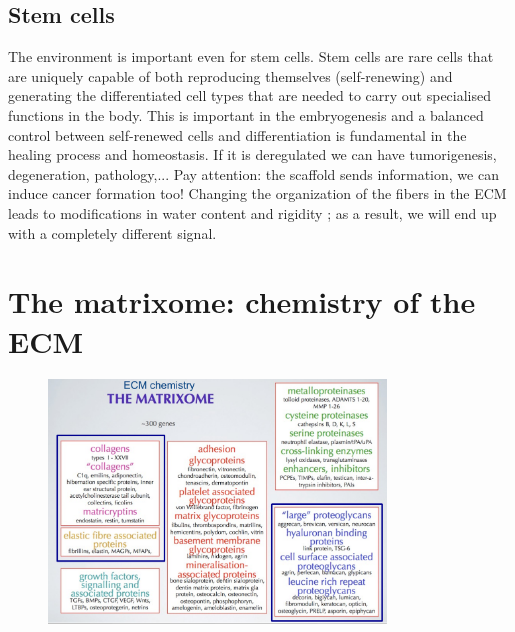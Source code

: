 \subsection{Stem cells}
The environment is important even for stem cells. Stem cells are rare cells that are uniquely capable of both reproducing themselves (self-renewing) and generating the differentiated cell types that are needed to carry out specialised functions in the body.
This is important in the embryogenesis and a balanced control between self-renewed cells and differentiation is fundamental in the healing process and homeostasis. If it is deregulated we can have tumorigenesis, degeneration, pathology,...
Pay attention: the scaffold sends information, we can induce cancer formation too!
Changing the organization of the fibers in the ECM leads to modifications in water content and rigidity ; as a result, we will end up with a completely different signal.

\section{The matrixome: chemistry of the ECM}
\begin{figure}[ht]
\centering
\includegraphics[width=0.8\textwidth]{matrixome}
\caption{\label{fig:matrixome}}
\end{figure}

